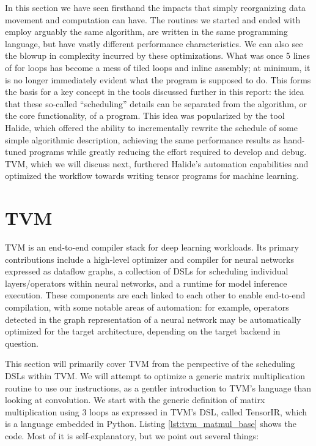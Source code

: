 \documentclass[acmsmall, nonacm=true]{acmart}
\begin{document}
In this section we have seen firsthand the impacts that simply reorganizing data movement and computation can have. The routines we started and ended with employ arguably the same algorithm, are written in the same programming language, but have vastly different performance characteristics. We can also see the blowup in complexity incurred by these optimizations. What was once 5 lines of for loops has become a mess of tiled loops and inline assembly; at minimum, it is no longer immediately evident what the program is supposed to do. This forms the basis for a key concept in the tools discussed further in this report: the idea that these so-called ``scheduling'' details can be separated from the algorithm, or the core functionality, of a program. This idea was popularized by the tool Halide, which offered the ability to incrementally rewrite the schedule of some simple algorithmic description, achieving the same performance results as hand-tuned programs while greatly reducing the effort required to develop and debug. TVM, which we will discuss next, furthered Halide's automation capabilities and optimized the workflow towards writing tensor programs for machine learning.



\section{TVM}

TVM\cite{tvm} is an end-to-end compiler stack for deep learning workloads. Its primary contributions include a high-level optimizer and compiler for neural networks expressed as dataflow graphs, a collection of DSLs for scheduling individual layers/operators within neural networks, and a runtime for model inference execution. These components are each linked to each other to enable end-to-end compilation, with some notable areas of automation: for example, operators detected in the graph representation of a neural network may be automatically optimized for the target architecture, depending on the target backend in question.

This section will primarily cover TVM from the perspective of the scheduling DSLs within TVM. We will attempt to optimize a generic matrix multiplication routine to use our instructions, as a gentler introduction to TVM's language than looking at convolution. We start with the generic definition of matirx multiplication using 3 loops as expressed in TVM's DSL, called TensorIR, which is a language embedded in Python. Listing \ref{lst:tvm_matmul_base} shows the code. Most of it is self-explanatory, but we point out several things:
\end{document}
